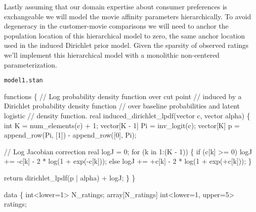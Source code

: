 \documentclass[
  letterpaper,
  DIV=11,
  numbers=noendperiod]{scrartcl}
\newenvironment{Shaded}{\begin{snugshade}}{\end{snugshade}}
\newcommand{\CommentTok}[1]{\textcolor[rgb]{0.37,0.37,0.37}{#1}}
\newcommand{\ControlFlowTok}[1]{\textcolor[rgb]{0.00,0.23,0.31}{#1}}
\newcommand{\DataTypeTok}[1]{\textcolor[rgb]{0.68,0.00,0.00}{#1}}
\newcommand{\DecValTok}[1]{\textcolor[rgb]{0.68,0.00,0.00}{#1}}
\newcommand{\KeywordTok}[1]{\textcolor[rgb]{0.00,0.23,0.31}{#1}}
\newcommand{\NormalTok}[1]{\textcolor[rgb]{0.00,0.23,0.31}{#1}}
\begin{document}
Lastly assuming that our domain expertise about consumer preferences is
exchangeable we will model the movie affinity parameters hierarchically.
To avoid degeneracy in the customer-movie comparisons we will need to
anchor the population location of this hierarchical model to zero, the
same anchor location used in the induced Dirichlet prior model. Given
the sparsity of observed ratings we'll implement this hierarchical model
with a monolithic non-centered parameterization.

\begin{codelisting}

\caption{\texttt{model1.stan}}

\begin{Shaded}
\begin{Highlighting}[]
\KeywordTok{functions}\NormalTok{ \{}
  \CommentTok{// Log probability density function over cut point}
  \CommentTok{// induced by a Dirichlet probability density function}
  \CommentTok{// over baseline probabilities and latent logistic}
  \CommentTok{// density function.}
  \DataTypeTok{real}\NormalTok{ induced\_dirichlet\_lpdf(}\DataTypeTok{vector}\NormalTok{ c, }\DataTypeTok{vector}\NormalTok{ alpha) \{}
    \DataTypeTok{int}\NormalTok{ K = num\_elements(c) + }\DecValTok{1}\NormalTok{;}
    \DataTypeTok{vector}\NormalTok{[K {-} }\DecValTok{1}\NormalTok{] Pi = inv\_logit(c);}
    \DataTypeTok{vector}\NormalTok{[K] p = append\_row(Pi, [}\DecValTok{1}\NormalTok{]\textquotesingle{}) {-} append\_row([}\DecValTok{0}\NormalTok{]\textquotesingle{}, Pi);}

    \CommentTok{// Log Jacobian correction}
    \DataTypeTok{real}\NormalTok{ logJ = }\DecValTok{0}\NormalTok{;}
    \ControlFlowTok{for}\NormalTok{ (k }\ControlFlowTok{in} \DecValTok{1}\NormalTok{:(K {-} }\DecValTok{1}\NormalTok{)) \{}
      \ControlFlowTok{if}\NormalTok{ (c[k] \textgreater{}= }\DecValTok{0}\NormalTok{)}
\NormalTok{        logJ += {-}c[k] {-} }\DecValTok{2}\NormalTok{ * log(}\DecValTok{1}\NormalTok{ + exp({-}c[k]));}
      \ControlFlowTok{else}
\NormalTok{        logJ += +c[k] {-} }\DecValTok{2}\NormalTok{ * log(}\DecValTok{1}\NormalTok{ + exp(+c[k]));}
\NormalTok{    \}}

    \ControlFlowTok{return}\NormalTok{ dirichlet\_lpdf(p | alpha) + logJ;}
\NormalTok{  \}}
\NormalTok{\}}

\KeywordTok{data}\NormalTok{ \{}
  \DataTypeTok{int}\NormalTok{\textless{}}\KeywordTok{lower}\NormalTok{=}\DecValTok{1}\NormalTok{\textgreater{} N\_ratings;}
  \DataTypeTok{array}\NormalTok{[N\_ratings] }\DataTypeTok{int}\NormalTok{\textless{}}\KeywordTok{lower}\NormalTok{=}\DecValTok{1}\NormalTok{, }\KeywordTok{upper}\NormalTok{=}\DecValTok{5}\NormalTok{\textgreater{} ratings;}


\end{Highlighting}
\end{Shaded}
\end{codelisting}
\end{document}
